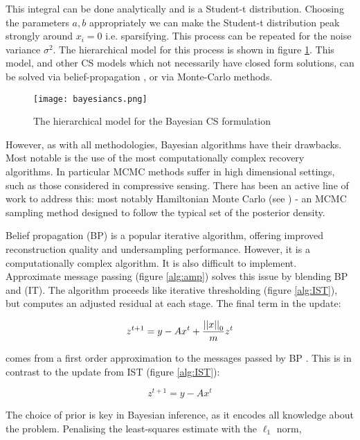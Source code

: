 This integral can be done analytically and is a Student-t distribution. Choosing the parameters \(a,b\) appropriately we can make the Student-t distribution peak strongly around \(x_i = 0\) i.e. sparsifying. This process can be repeated for the noise variance \(\sigma^2\). The hierarchical model for this process is shown in figure \ref{fig:bayesiancs}. This model, and other CS models which not necessarily have closed form solutions, can be solved via belief-propagation \cite{Baron2010}, or via Monte-Carlo methods.

\begin{figure}[h]
\centering
\texttt{[image: bayesiancs.png]}
\caption{The hierarchical model for the Bayesian CS formulation \cite{Ji2008}}
\label{fig:bayesiancs}
\end{figure}

However, as with all methodologies, Bayesian algorithms have their drawbacks. Most notable is the use of the most computationally complex recovery algorithms. In particular MCMC methods suffer in high dimensional settings, such as those considered in compressive sensing. There has been an active line of work to address this: most notably Hamiltonian Monte Carlo (see \cite{neal2011mcmc}) - an MCMC sampling method designed to follow the typical set of the posterior density. 

Belief propagation (BP) \cite{Yedidia2011} is a popular iterative algorithm, offering improved reconstruction quality and undersampling performance. However, it is a computationally complex algorithm. It is also difficult to implement. Approximate message passing (figure \ref{alg:amp}) solves this issue by blending BP and (IT). The algorithm proceeds like iterative thresholding (figure \ref{alg:IST}), but computes an adjusted residual at each stage. The final term in the update:

\begin{equation}
z^{t+1} = y - Ax^t + \frac{\left|\left|x\right|\right|_0}{m}z^t
\end{equation}

comes from a first order approximation to the messages passed by BP \cite{metzler2014denoising}. This is in contrast to the update from IST (figure \ref{alg:IST}):

\begin{equation}
z^{t+1} = y - Ax^t
\end{equation}

The choice of prior is key in Bayesian inference, as it encodes all knowledge about the problem. Penalising the least-squares estimate  with the \(\ell_1\) norm,

